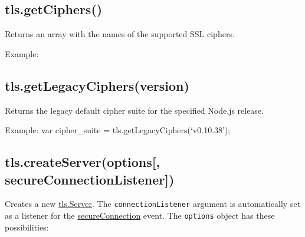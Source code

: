 \subsection{tls.getCiphers()}\label{tls.getciphers}

Returns an array with the names of the supported SSL ciphers.

Example:

\begin{Shaded}
\begin{Highlighting}[]
 \NormalTok{();}
\end{Highlighting}
\end{Shaded}

\subsection{tls.getLegacyCiphers(version)}\label{tls.getlegacyciphersversion}

Returns the legacy default cipher suite for the specified Node.js
release.

Example: var cipher\_suite = tls.getLegacyCiphers(`v0.10.38');

\subsection{tls.createServer(options{[},
secureConnectionListener{]})}\label{tls.createserveroptions-secureconnectionlistener}

Creates a new \hyperref[tlsux5fclassux5ftlsux5fserver]{tls.Server}. The
\texttt{connectionListener} argument is automatically set as a listener
for the \hyperref[tlsux5feventux5fsecureconnection]{secureConnection}
event. The \texttt{options} object has these possibilities:

